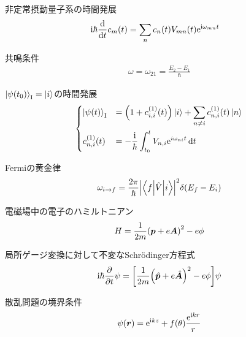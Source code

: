 \documentclass{report}
\begin{document}
\begin{itembox}[l]{非定常摂動量子系の時間発展}
  \begin{align}
    \mathrm{i}\hbar\dv{t}c_m(t) &= \sum_{n}c_n(t)V_{mn}(t)\mathrm{e}^{\mathrm{i}\omega_{mn}t}
  \end{align}
\end{itembox}

\begin{itembox}[l]{共鳴条件}
  \begin{align}
    \omega = \omega_{21} = \frac{E_2 - E_1}{\hbar}
  \end{align}
\end{itembox}

\begin{itembox}[l]{$\ket{\psi(t_0)}_{\mathrm{I}} = \ket{i}$の時間発展}
  \begin{align}
    \begin{dcases}
      \ket{\psi(t)}_{\mathrm{I}}& = \qty(1 + c_{i, i}^{(1)}(t))\ket{i} + \sum_{n\neq i}c_{n, i}^{(1)}(t)\ket{n} \\
      c_{n, i}^{(1)}(t) &= -\frac{\mathrm{i}}{\hbar}\int_{t_0}^{t}V_{n, i}\mathrm{e}^{i\omega_{ni}t}\dd{t}
    \end{dcases}
  \end{align}
\end{itembox}

\begin{itembox}[l]{Fermiの黄金律}
  \begin{align}
    \omega_{i\to f} = \frac{2\pi}{\hbar}\abs{\mel**{f}{\hat{V}}{i}}^2\delta(E_f - E_i)
  \end{align}
\end{itembox}

\begin{itembox}[l]{電磁場中の電子のハミルトニアン}
  \begin{align}
    H = \frac{1}{2m}\qty(\bm{p} + e\bm{A})^2 - e\phi
  \end{align}
\end{itembox}

\begin{itembox}[l]{局所ゲージ変換に対して不変なSchrödinger方程式}
  \begin{align}
    \mathrm{i}\hbar\pdv{t}\psi = \qty[\frac{1}{2m}\qty(\hat{\bm{p}} + e\hat{\bm{A}})^2 - e\phi]\psi
  \end{align}
\end{itembox}

\begin{itembox}[l]{散乱問題の境界条件}
  \begin{equation}
    \psi(\bm{r}) = \mathrm{e}^{\mathrm{i} kz} + f(\theta) \frac{\mathrm{e}^{\mathrm{i} kr}}{r}
  \end{equation}
\end{itembox}
\end{document}

